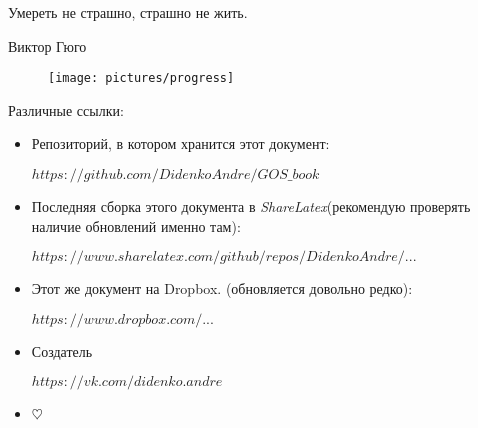 \epigraph{Умереть не страшно, страшно не жить.}{Виктор Гюго}

\begin{figure}[h!]
\texttt{[image: pictures/progress]}
\end{figure}

\mbox{}

Различные ссылки:
\begin{itemize}
\item

Репозиторий, в котором хранится этот документ:

\href{https://github.com/DidenkoAndre/GOS_book}{$https://github.com/DidenkoAndre/GOS\_book$}

\item
Последняя сборка этого документа в \textit{ShareLatex}\newline (рекомендую проверять наличие обновлений именно там): 

\href{https://www.sharelatex.com/github/repos/DidenkoAndre/GOS_book/builds/latest/output.pdf}{$https://www.sharelatex.com/github/repos/DidenkoAndre/...$}

\item

Этот же документ на Dropbox.  \newline (обновляется довольно редко):

\href{https://www.dropbox.com/sh/7e5mfj8q68o2ipp/AAD8XvpZhiJzFbEh_IeH305ia?dl=0&preview=GOSMat.pdf}{$https://www.dropbox.com/...$}

\item
Создатель

\href{https://vk.com/didenko.andre}{$https://vk.com/didenko.andre$}

\item

$\heartsuit$
\end{itemize}


